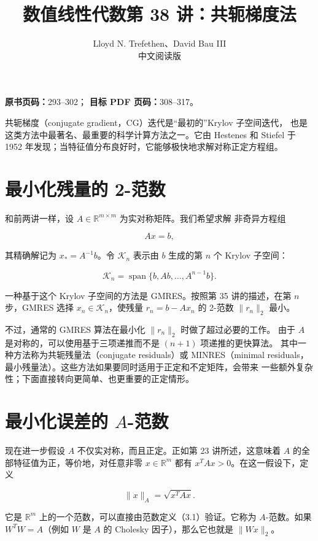 \documentclass[UTF8,fontset=none,12pt]{ctexart}
\title{数值线性代数\quad 第 38 讲：共轭梯度法}
\author{Lloyd N. Trefethen、David Bau III\\中文阅读版}
\date{}
\begin{document}
\maketitle

\noindent
\textbf{原书页码：}293--302；\quad
\textbf{目标 PDF 页码：}308--317。

共轭梯度（conjugate gradient，CG）迭代是“最初的”Krylov 子空间迭代，
也是这类方法中最著名、最重要的科学计算方法之一。它由 Hestenes 和 Stiefel
于 1952 年发现；当特征值分布良好时，它能够极快地求解对称正定方程组。

\section*{最小化残量的 2-范数}

和前两讲一样，设 $A\in\mathbb R^{m\times m}$ 为实对称矩阵。我们希望求解
非奇异方程组

\[
Ax=b,
\]

其精确解记为 $x_\ast=A^{-1}b$。令 $\mathcal K_n$ 表示由 $b$ 生成的第 $n$
个 Krylov 子空间：

\begin{equation}
\mathcal K_n=\operatorname{span}\{b,Ab,\ldots,A^{n-1}b\}.
\tag{38.1}
\end{equation}

一种基于这个 Krylov 子空间的方法是 GMRES。按照第 35 讲的描述，在第 $n$
步，GMRES 选择 $x_n\in\mathcal K_n$，使残量
$r_n=b-Ax_n$ 的 2-范数 $\lVert r_n\rVert_2$ 最小。

不过，通常的 GMRES 算法在最小化 $\lVert r_n\rVert_2$ 时做了超过必要的工作。
由于 $A$ 是对称的，可以使用基于三项递推而不是 $(n+1)$ 项递推的更快算法。
其中一种方法称为共轭残量法（conjugate residuals）或 MINRES（minimal
residuals，最小残量法）。这些方法如果要同时适用于正定和不定矩阵，会带来
一些额外复杂性；下面直接转向更简单、也更重要的正定情形。

\section*{最小化误差的 $A$-范数}

现在进一步假设 $A$ 不仅实对称，而且正定。正如第 23 讲所述，这意味着
$A$ 的全部特征值为正，等价地，对任意非零 $x\in\mathbb R^m$ 都有
$x^TAx>0$。在这一假设下，定义

\begin{equation}
\lVert x\rVert_A=\sqrt{x^TAx}.
\tag{38.2}
\end{equation}

它是 $\mathbb R^m$ 上的一个范数，可以直接由范数定义（3.1）验证。它称为
$A$-范数。如果 $W^TW=A$（例如 $W$ 是 $A$ 的 Cholesky 因子），那么它也就是
$\lVert Wx\rVert_2$。
\end{document}
